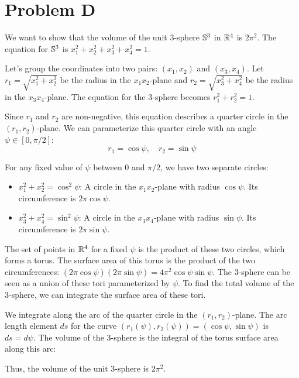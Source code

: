 \documentclass[12pt,letterpaper]{article}
\begin{document}
\clearpage

\section*{Problem D}

We want to show that the volume of the unit 3-sphere $\mathbb{S}^3$ in $\mathbb{R}^4$ is $2\pi^2$. The equation for $\mathbb{S}^3$ is $x_1^2 + x_2^2 + x_3^2 + x_4^2 = 1$.

Let's group the coordinates into two pairs: $(x_1, x_2)$ and $(x_3, x_4)$. Let $r_1 = \sqrt{x_1^2 + x_2^2}$ be the radius in the $x_1x_2$-plane and $r_2 = \sqrt{x_3^2 + x_4^2}$ be the radius in the $x_3x_4$-plane. The equation for the 3-sphere becomes $r_1^2 + r_2^2 = 1$.

Since $r_1$ and $r_2$ are non-negative, this equation describes a quarter circle in the $(r_1, r_2)$-plane. We can parameterize this quarter circle with an angle $\psi \in [0, \pi/2]$:
\[ r_1 = \cos\psi, \quad r_2 = \sin\psi \]

For any fixed value of $\psi$ between $0$ and $\pi/2$, we have two separate circles:
\begin{itemize}
    \item $x_1^2 + x_2^2 = \cos^2\psi$: A circle in the $x_1x_2$-plane with radius $\cos\psi$. Its circumference is $2\pi\cos\psi$.
    \item $x_3^2 + x_4^2 = \sin^2\psi$: A circle in the $x_3x_4$-plane with radius $\sin\psi$. Its circumference is $2\pi\sin\psi$.
\end{itemize}
The set of points in $\mathbb{R}^4$ for a fixed $\psi$ is the product of these two circles, which forms a torus. The surface area of this torus is the product of the two circumferences: $(2\pi\cos\psi)(2\pi\sin\psi) = 4\pi^2\cos\psi\sin\psi$. The 3-sphere can be seen as a union of these tori parameterized by $\psi$. To find the total volume of the 3-sphere, we can integrate the surface area of these tori.

We integrate along the arc of the quarter circle in the $(r_1, r_2)$-plane. The arc length element $ds$ for the curve $(r_1(\psi), r_2(\psi)) = (\cos\psi, \sin\psi)$ is $ds = d\psi$. The volume of the 3-sphere is the integral of the torus surface area along this arc:

Thus, the volume of the unit 3-sphere is $2\pi^2$.
\end{document}

